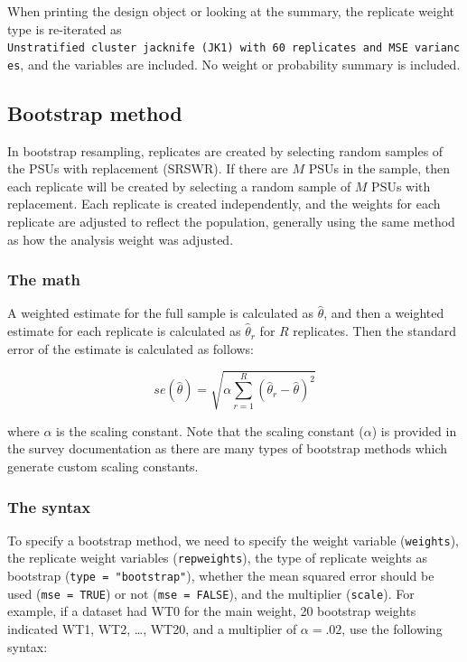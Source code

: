 \documentclass[
]{krantz}
\begin{document}
When printing the design object or looking at the summary, the replicate weight type is re-iterated as \texttt{Unstratified\ cluster\ jacknife\ (JK1)\ with\ 60\ replicates\ and\ MSE\ variances}, and the variables are included. No weight or probability summary is included.

\hypertarget{bootstrap-method}{%
\subsection{Bootstrap method}\label{bootstrap-method}}

In bootstrap resampling, replicates are created by selecting random samples of the PSUs with replacement (SRSWR). If there are \(M\) PSUs in the sample, then each replicate will be created by selecting a random sample of \(M\) PSUs with replacement. Each replicate is created independently, and the weights for each replicate are adjusted to reflect the population, generally using the same method as how the analysis weight was adjusted.

\hypertarget{the-math-7}{%
\subsubsection*{The math}\label{the-math-7}}


A weighted estimate for the full sample is calculated as \(\hat{\theta}\), and then a weighted estimate for each replicate is calculated as \(\hat{\theta}_r\) for \(R\) replicates. Then the standard error of the estimate is calculated as follows:

\[se(\hat{\theta})=\sqrt{\alpha \sum_{r=1}^R \left( \hat{\theta}_r-\hat{\theta}\right)^2}\]

where \(\alpha\) is the scaling constant. Note that the scaling constant (\(\alpha\)) is provided in the survey documentation as there are many types of bootstrap methods which generate custom scaling constants.

\hypertarget{the-syntax-7}{%
\subsubsection*{The syntax}\label{the-syntax-7}}


To specify a bootstrap method, we need to specify the weight variable (\texttt{weights}), the replicate weight variables (\texttt{repweights}), the type of replicate weights as bootstrap (\texttt{type\ =\ "bootstrap"}), whether the mean squared error should be used (\texttt{mse\ =\ TRUE}) or not (\texttt{mse\ =\ FALSE}), and the multiplier (\texttt{scale}). For example, if a dataset had WT0 for the main weight, 20 bootstrap weights indicated WT1, WT2, \ldots, WT20, and a multiplier of \(\alpha=.02\), use the following syntax:
\end{document}
